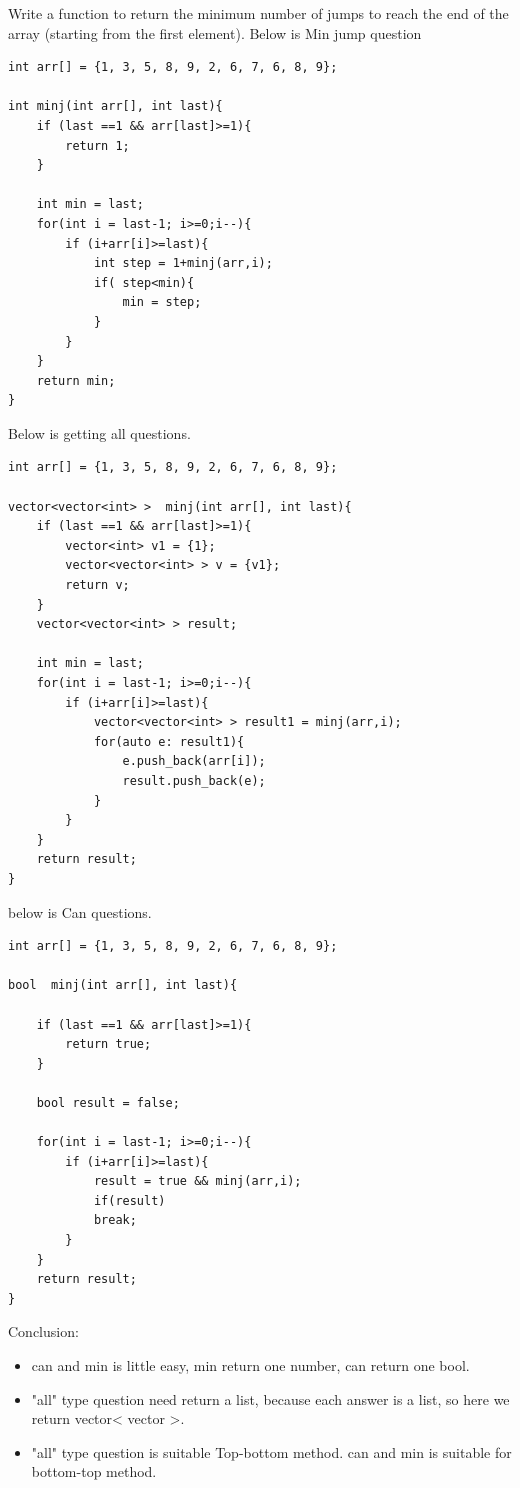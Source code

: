 \documentclass[a4paper,11pt,twoside]{book}
\begin{document}
	\par Write a function to return the minimum number of jumps to reach the end of the array (starting from the first element). Below is Min jump question
	
\begin{lstlisting}[numbers=none]
int arr[] = {1, 3, 5, 8, 9, 2, 6, 7, 6, 8, 9};

int minj(int arr[], int last){		
	if (last ==1 && arr[last]>=1){
		return 1;
	}
	
	int min = last;
	for(int i = last-1; i>=0;i--){
		if (i+arr[i]>=last){
			int step = 1+minj(arr,i);
			if( step<min){
				min = step;
			}
		}    
	}
	return min;
}		
\end{lstlisting} 		
	
	
	\par Below is getting all questions.  
\begin{lstlisting}[numbers=none]
int arr[] = {1, 3, 5, 8, 9, 2, 6, 7, 6, 8, 9};

vector<vector<int> >  minj(int arr[], int last){	
	if (last ==1 && arr[last]>=1){
		vector<int> v1 = {1};
		vector<vector<int> > v = {v1};
		return v;
	}	
	vector<vector<int> > result;
	
	int min = last;
	for(int i = last-1; i>=0;i--){
		if (i+arr[i]>=last){
			vector<vector<int> > result1 = minj(arr,i);
			for(auto e: result1){
				e.push_back(arr[i]);
				result.push_back(e);
			}
		}
	}
	return result;
}					
\end{lstlisting} 	
	
	\par below is Can questions.  
\begin{lstlisting}[numbers=none]
int arr[] = {1, 3, 5, 8, 9, 2, 6, 7, 6, 8, 9};

bool  minj(int arr[], int last){
	
	if (last ==1 && arr[last]>=1){
		return true;
	}
	
	bool result = false;
	
	for(int i = last-1; i>=0;i--){
		if (i+arr[i]>=last){
			result = true && minj(arr,i);
			if(result)
			break;
		}
	}
	return result;
}		
\end{lstlisting} 	
	
	\par Conclusion:
	\begin{itemize}
		\item can and min is little easy, min return one number, can return one bool. 
		
		\item "all" type question need return a list, because each answer is a list, so here we return vector< vector >. 
		
		\item "all" type question is suitable Top-bottom method. can and min is suitable for bottom-top method.
	\end{itemize}
	
\end{document}
